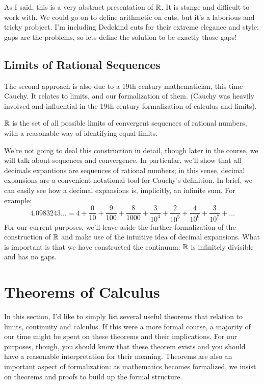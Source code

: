\documentclass[fleqn]{report}
\begin{document}
As I said, this is a very abstract presentation of $\mathbb{R}$. It
is stange and difficult to work with. We could go on to
define arithmetic on cuts, but it's a laborious and tricky
probject. I'm including Dedekind cuts for their extreme
elegance and style: gaps are the problems, so lets define the
solution to be exactly those gaps! 

\subsection{Limits of Rational Sequences}
\label{rational-sequences}

The second approach is also due to a 19th century
mathematician, this time Cauchy. It relates to limits, and
our formalization of them. (Cauchy was heavily involved and
influential in the 19th century formalization of calculus and
limits). 

\begin{defn}
$\mathbb{R}$ is the set of all possible limits of convergent
sequences of rational numbers, with a reasonable way of
identifying equal limits.
\end{defn}

We're not going to deal this construction in detail, though
later in the course, we will talk about sequences and
convergence. In particular, we'll show that all decimals
expantions are sequences of rational numbers; in this sense,
decimal expansions are a convenient notational tool for
Cauchy's definition. In brief, we can easily see how a
decimal expansions is, implicitly, an infinite sum. For
example: 
\begin{equation*}
4.0983243\ldots = 4 + \frac{0}{10} + \frac{9}{100} +
\frac{8}{1000} + \frac{3}{10^4} + \frac{2}{10^5} +
\frac{4}{10^6} + \frac{3}{10^7} + \ldots
\end{equation*}
For our current purposes, we'll leave aside the further
formalization of the construction of $\mathbb{R}$ and make use of the
intuitive idea of decimal expansions. What is important is
that we have constructed the continuum: $\mathbb{R}$ is infinitely
divisible and has no gaps. 

\section{Theorems of Calculus}
\label{theorems}

In this section, I'd like to simply list several useful
theorems that relation to limits, continuity and calculus. If
this were a more formal course, a majority of our time might
be spent on these theorems and their implications. For our
purposes, though, you should know that these theorem exists
and you should have a reasonable interpretation for their
meaning. Theorems are also an important aspect of
formalization: as mathematics becomes formalized, we insist on
theorems and proofs to build up the formal structure.
\end{document}
